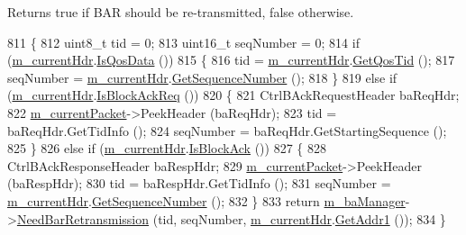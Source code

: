 \begin{DoxyReturn}{Returns}
true if B\+AR should be re-\/transmitted, false otherwise. 
\end{DoxyReturn}

\begin{DoxyCode}
811 \{
812   uint8\_t tid = 0;
813   uint16\_t seqNumber = 0;
814   \textcolor{keywordflow}{if} (\hyperlink{classns3_1_1DcaTxop_ae965eb2f4d504e00526e751cd1dab3a6}{m\_currentHdr}.\hyperlink{classns3_1_1WifiMacHeader_a922e8c2b26023f2627ea19d9c4f4738b}{IsQosData} ())
815     \{
816       tid = \hyperlink{classns3_1_1DcaTxop_ae965eb2f4d504e00526e751cd1dab3a6}{m\_currentHdr}.\hyperlink{classns3_1_1WifiMacHeader_a2b3faf14ac0d16a29729a2336afd7662}{GetQosTid} ();
817       seqNumber = \hyperlink{classns3_1_1DcaTxop_ae965eb2f4d504e00526e751cd1dab3a6}{m\_currentHdr}.\hyperlink{classns3_1_1WifiMacHeader_aa202a29c2d6aebe9b3d589e58cbd17bb}{GetSequenceNumber} ();
818     \}
819   \textcolor{keywordflow}{else} \textcolor{keywordflow}{if} (\hyperlink{classns3_1_1DcaTxop_ae965eb2f4d504e00526e751cd1dab3a6}{m\_currentHdr}.\hyperlink{classns3_1_1WifiMacHeader_a44f012384009b131d21512459c727f02}{IsBlockAckReq} ())
820     \{
821       CtrlBAckRequestHeader baReqHdr;
822       \hyperlink{classns3_1_1DcaTxop_a3c454c21337aac0944f86caad8b7a719}{m\_currentPacket}->PeekHeader (baReqHdr);
823       tid = baReqHdr.GetTidInfo ();
824       seqNumber = baReqHdr.GetStartingSequence ();
825     \}
826   \textcolor{keywordflow}{else} \textcolor{keywordflow}{if} (\hyperlink{classns3_1_1DcaTxop_ae965eb2f4d504e00526e751cd1dab3a6}{m\_currentHdr}.\hyperlink{classns3_1_1WifiMacHeader_a273fb5273dcb6c690ac66a7caf72d305}{IsBlockAck} ())
827     \{
828       CtrlBAckResponseHeader baRespHdr;
829       \hyperlink{classns3_1_1DcaTxop_a3c454c21337aac0944f86caad8b7a719}{m\_currentPacket}->PeekHeader (baRespHdr);
830       tid = baRespHdr.GetTidInfo ();
831       seqNumber = \hyperlink{classns3_1_1DcaTxop_ae965eb2f4d504e00526e751cd1dab3a6}{m\_currentHdr}.\hyperlink{classns3_1_1WifiMacHeader_aa202a29c2d6aebe9b3d589e58cbd17bb}{GetSequenceNumber} ();
832     \}
833   \textcolor{keywordflow}{return} \hyperlink{classns3_1_1EdcaTxopN_a7a79eaafe03995bb274451aa752b83b2}{m\_baManager}->\hyperlink{classns3_1_1BlockAckManager_a8be3e6dc77c96e4cbc317302ad79a5ac}{NeedBarRetransmission} (tid, seqNumber, 
      \hyperlink{classns3_1_1DcaTxop_ae965eb2f4d504e00526e751cd1dab3a6}{m\_currentHdr}.\hyperlink{classns3_1_1WifiMacHeader_a5ddcfd82e7c5a17ffea5be9246544530}{GetAddr1} ());
834 \}
\end{DoxyCode}


